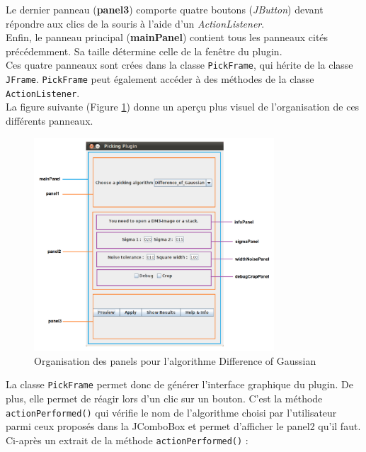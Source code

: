 Le dernier panneau (\textbf{panel3}) comporte quatre boutons (\emph{JButton}) devant répondre aux clics de la souris à l'aide d'un \emph{ActionListener}. \\

Enfin, le panneau principal (\textbf{mainPanel}) contient tous les panneaux cités précédemment. Sa taille détermine celle de la fenêtre du plugin. \\
Ces quatre panneaux sont crées dans la classe \texttt{PickFrame}, qui hérite de la classe \texttt{JFrame}. \texttt{PickFrame} peut également accéder à des méthodes de la classe \texttt{ActionListener}. \\

\pagebreak
La figure suivante (Figure \ref{panneauxDetail}) donne un aperçu plus visuel de l'organisation de ces différents panneaux.
\begin{figure}[!ht] 
\begin{center}
\includegraphics[width=0.8\textwidth]{plugin3-1.png}
\caption{Organisation des panels pour l'algorithme Difference of Gaussian}
\label{panneauxDetail}
\end{center}
\end{figure}

La classe \texttt{PickFrame} permet donc de générer l'interface graphique du plugin. De plus, elle permet de réagir lors d'un clic sur un bouton. C'est la méthode \texttt{actionPerformed()} qui vérifie le nom de l'algorithme choisi par l'utilisateur parmi ceux proposés dans la JComboBox et permet d'afficher le panel2 qu'il faut. Ci-après un extrait de la méthode \texttt{actionPerformed()} :

